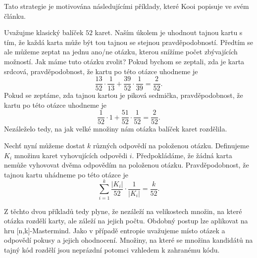 Tato strategie je motivována následujícími příklady, které Kooi \cite{kooi} popisuje ve svém článku. 

\begin{prikl}\label{prdvecasti}
    Uvažujme klasický balíček $52$ karet. Naším úkolem je uhodnout tajnou kartu s tím, že každá karta může být tou tajnou se stejnou pravděpodobností. Předtím se ale můžeme zeptat na jednu ano/ne otázku, kterou snížíme počet zbývajících možností. Jak máme tuto otázku zvolit? 
    Pokud bychom se zeptali, zda je karta srdcová, pravděpodobnost, že kartu po této otázce uhodneme je 
    \[\frac{13}{52} \cdot \frac{1}{13} + \frac{39}{52} \cdot \frac{1}{39} = \frac{2}{52}.\]
    Pokud se zeptáme, zda tajnou kartou je piková sedmička, pravděpodobnost, že kartu po této otázce uhodneme je 
     \[\frac{1}{52} \cdot 1 + \frac{51}{52} \cdot \frac{1}{52} = \frac{2}{52}.\] 
    Nezáleželo tedy, na jak velké množiny nám otázka balíček karet rozdělila. 
\end{prikl}\textbf{}

\begin{prikl}
    Nechť nyní můžeme dostat $k$ různých odpovědí na položenou otázku. Definujeme $K_i$ množinu karet vyhovujících odpovědi $i$. Předpokládáme, že žádná karta nemůže vyhovovat dvěma odpovědím na položenou otázku. Pravděpodobnost, že tajnou kartu uhádneme po této otázce je 
\[\sum_{i = 1}^k \frac{|K_i|}{52} \cdot \frac{1}{|K_i|} = \frac{k}{52}.\]
\end{prikl}


Z těchto dvou příkladů tedy plyne, že nezáleží na velikostech množin, na které otázka rozdělí karty, ale záleží na jejich počtu. Obdobný postup lze aplikovat na hru [n,k]-Mastermind. Jako v případě entropie uvažujeme místo otázek a odpovědí pokusy a jejich ohodnocení. Množiny, na které se množina kandidátů na tajný kód rozdělí jsou neprázdní potomci vzhledem k zahranému kódu. 











